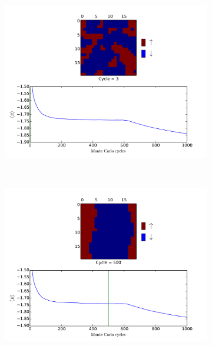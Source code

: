 \documentclass[twoside, 11pt]{article}
\begin{document}
			\begin{figure}
			    \centering
			    \begin{subfigure}[b]{0.3\textwidth}
			        \includegraphics[scale = 0.6, clip=true, trim=210 220 155 0]{../Results/extra/extra_3.pdf}
			    \end{subfigure}
			    ~ 
			    \begin{subfigure}[b]{0.3\textwidth}
			        \includegraphics[scale = 0.6, clip=true, trim=210 220 155 0]{../Results/extra/extra_500.pdf}
			    \end{subfigure}
			    ~ 
			    \begin{subfigure}[b]{0.3\textwidth}

\end{subfigure}
\end{figure}
\end{document}
